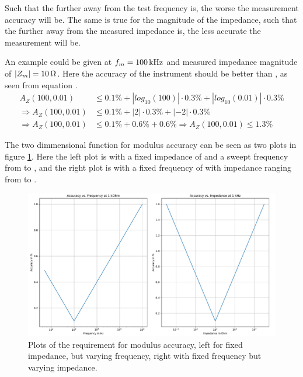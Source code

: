 Such that the further away from  the test frequency is, the worse the measurement accuracy will be. The same 
is true for the magnitude of the impedance, such that the further away from  the measured impedance is, the less
accurate the measurement will be.

An example could be given at $f_ m = \SI{100}{\kilo\hertz}$ and measured impedance magnitude of $|Z_m| = \SI{10}{\ohm}$. Here the
accuracy of the instrument should be better than , as seen from equation .
\begin{equation}
  \label{eq:5:A_Z_example}
  \begin{split}
    A_Z(100, 0.01) & \leq 0.1\% + |log_{10}(100)|\cdot0.3\%+|log_{10}(0.01)|\cdot0.3\% \\
    \Rightarrow A_Z(100, 0.01) & \leq 0.1\% + |2|\cdot0.3\%+|-2|\cdot0.3\% \\
    \Rightarrow A_Z(100,0.01) & \leq 0.1\% + 0.6\% + 0.6\% \Rightarrow A_Z(100,0.01) \leq 1.3\%
  \end{split}
\end{equation}

The two dimmensional function for modulus accuracy can be seen as two plots in figure \ref{fig_5_ModulusAccuracy}. Here the left plot is with a fixed impedance of 
and a sweept frequency from  to , and the right plot is with a fixed frequency of  with impedance ranging from  to .


\begin{figure}[H]
  \centering
  \includegraphics[width=1\textwidth]{Sections/5_SystemRequirements/Figures/ImpedanceSpec.pdf}
  \caption{Plots of the requirement for modulus accuracy, left for fixed impedance, but varying frequency, right with fixed frequency but varying impedance.}
  \label{fig_5_ModulusAccuracy}
\end{figure}

